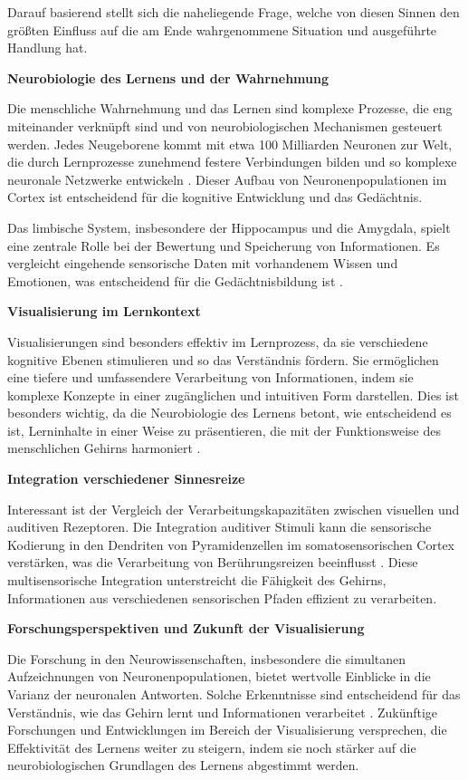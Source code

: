 Darauf basierend stellt sich die naheliegende Frage, welche von diesen Sinnen den größten Einfluss auf die am Ende wahrgenommene Situation und ausgeführte Handlung hat. 

\textbf{Neurobiologie des Lernens und der Wahrnehmung}

Die menschliche Wahrnehmung und das Lernen sind komplexe Prozesse, die eng miteinander verknüpft sind und von neurobiologischen Mechanismen gesteuert werden. Jedes Neugeborene kommt mit etwa 100 Milliarden Neuronen zur Welt, die durch Lernprozesse zunehmend festere Verbindungen bilden und so komplexe neuronale Netzwerke entwickeln \cite{UllmannNeurobiologie}. Dieser Aufbau von Neuronenpopulationen im Cortex ist entscheidend für die kognitive Entwicklung und das Gedächtnis.

Das limbische System, insbesondere der Hippocampus und die Amygdala, spielt eine zentrale Rolle bei der Bewertung und Speicherung von Informationen. Es vergleicht eingehende sensorische Daten mit vorhandenem Wissen und Emotionen, was entscheidend für die Gedächtnisbildung ist \cite{WÜRZ, UllmannLimbicSystem}. 

\textbf{Visualisierung im Lernkontext}

Visualisierungen sind besonders effektiv im Lernprozess, da sie verschiedene kognitive Ebenen stimulieren und so das Verständnis fördern. Sie ermöglichen eine tiefere und umfassendere Verarbeitung von Informationen, indem sie komplexe Konzepte in einer zugänglichen und intuitiven Form darstellen. Dies ist besonders wichtig, da die Neurobiologie des Lernens betont, wie entscheidend es ist, Lerninhalte in einer Weise zu präsentieren, die mit der Funktionsweise des menschlichen Gehirns harmoniert \cite{UllmannMentalRepresentation}.

\textbf{Integration verschiedener Sinnesreize}

Interessant ist der Vergleich der Verarbeitungskapazitäten zwischen visuellen und auditiven Rezeptoren. Die Integration auditiver Stimuli kann die sensorische Kodierung in den Dendriten von Pyramidenzellen im somatosensorischen Cortex verstärken, was die Verarbeitung von Berührungsreizen beeinflusst \cite{NatureCommunications}. Diese multisensorische Integration unterstreicht die Fähigkeit des Gehirns, Informationen aus verschiedenen sensorischen Pfaden effizient zu verarbeiten.

\textbf{Forschungsperspektiven und Zukunft der Visualisierung}

Die Forschung in den Neurowissenschaften, insbesondere die simultanen Aufzeichnungen von Neuronenpopulationen, bietet wertvolle Einblicke in die Varianz der neuronalen Antworten. Solche Erkenntnisse sind entscheidend für das Verständnis, wie das Gehirn lernt und Informationen verarbeitet \cite{FrontiersInNeuroscience}. Zukünftige Forschungen und Entwicklungen im Bereich der Visualisierung versprechen, die Effektivität des Lernens weiter zu steigern, indem sie noch stärker auf die neurobiologischen Grundlagen des Lernens abgestimmt werden.


